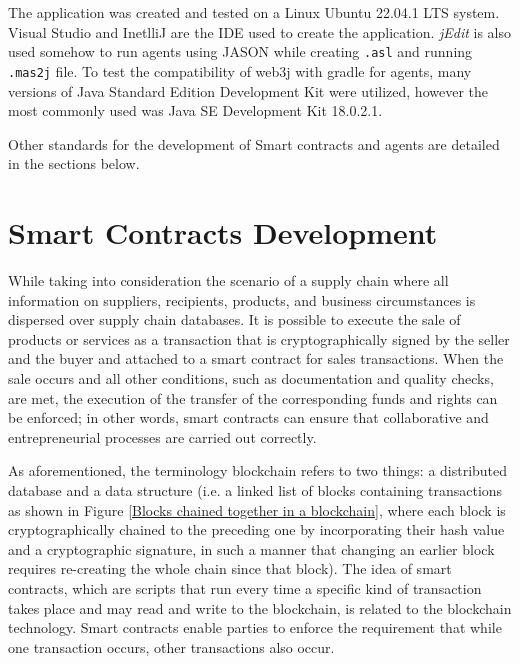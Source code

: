 The application was created and tested on a Linux Ubuntu 22.04.1 LTS system.
Visual Studio and InetlliJ are the \ac{IDE} used to create the application. \textit{jEdit} is also used somehow to run agents using JASON while creating \texttt{.asl} and running \texttt{.mas2j} file.
To test the compatibility of web3j with gradle for agents, many versions of Java Standard Edition Development Kit were utilized, however the most commonly used was Java SE Development Kit 18.0.2.1. 

\vspace{.5cm}

Other standards for the development of Smart contracts and agents are detailed in the sections below.

\section{Smart Contracts Development }   

While taking into consideration the scenario of a supply chain where all information on suppliers, recipients, products, and business circumstances is dispersed over supply chain databases.
It is possible to execute the sale of products or services as a transaction that is cryptographically signed by the seller and the buyer and attached to a smart contract for sales transactions. When the sale occurs and all other conditions, such as documentation and quality checks, are met, the execution of the transfer of the corresponding funds and rights can be enforced; in other words, smart contracts can ensure that collaborative and entrepreneurial processes are carried out correctly.

\vspace{.5cm}

As aforementioned, the terminology blockchain refers to two things: a distributed database and a data structure (i.e. a linked list of blocks containing transactions as shown in Figure \ref{Blocks chained together in a blockchain}, where each block is cryptographically chained to the preceding one by incorporating their hash value and a cryptographic signature, in such a manner that changing an earlier block requires re-creating the whole chain since that block). The idea of smart contracts, which are scripts that run every time a specific kind of transaction takes place and may read and write to the blockchain, is related to the blockchain technology. Smart contracts enable parties to enforce the requirement that while one transaction occurs, other transactions also occur.

